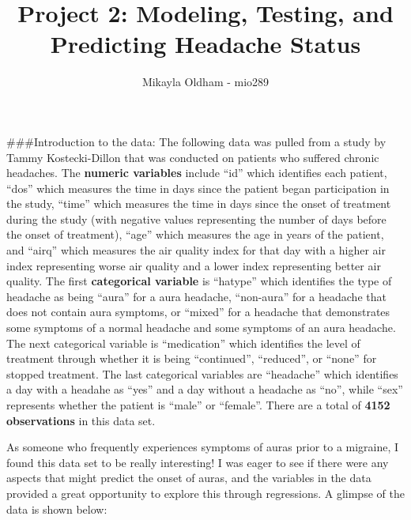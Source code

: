 \documentclass[]{article}
\title{Project 2: Modeling, Testing, and Predicting Headache Status}
\author{Mikayla Oldham - mio289}
\date{}
\newenvironment{Shaded}{\begin{snugshade}}{\end{snugshade}}
\newcommand{\KeywordTok}[1]{\textcolor[rgb]{0.13,0.29,0.53}{\textbf{#1}}}
\newcommand{\NormalTok}[1]{#1}
\newcommand{\OperatorTok}[1]{\textcolor[rgb]{0.81,0.36,0.00}{\textbf{#1}}}
\newcommand{\StringTok}[1]{\textcolor[rgb]{0.31,0.60,0.02}{#1}}
\begin{document}
\maketitle

\#\#\#Introduction to the data: The following data was pulled from a
study by Tammy Kostecki-Dillon that was conducted on patients who
suffered chronic headaches. The \textbf{numeric variables} include
``id'' which identifies each patient, ``dos'' which measures the time in
days since the patient began participation in the study, ``time'' which
measures the time in days since the onset of treatment during the study
(with negative values representing the number of days before the onset
of treatment), ``age'' which measures the age in years of the patient,
and ``airq'' which measures the air quality index for that day with a
higher air index representing worse air quality and a lower index
representing better air quality. The first \textbf{categorical variable}
is ``hatype'' which identifies the type of headache as being ``aura''
for a aura headache, ``non-aura'' for a headache that does not contain
aura symptoms, or ``mixed'' for a headache that demonstrates some
symptoms of a normal headache and some symptoms of an aura headache. The
next categorical variable is ``medication'' which identifies the level
of treatment through whether it is being ``continued'', ``reduced'', or
``none'' for stopped treatment. The last categorical variables are
``headache'' which identifies a day with a headahe as ``yes'' and a day
without a headache as ``no'', while ``sex'' represents whether the
patient is ``male'' or ``female''. There are a total of \textbf{4152
observations} in this data set.

As someone who frequently experiences symptoms of auras prior to a
migraine, I found this data set to be really interesting! I was eager to
see if there were any aspects that might predict the onset of auras, and
the variables in the data provided a great opportunity to explore this
through regressions. A glimpse of the data is shown below:

\begin{Shaded}
\end{Shaded}
\end{document}
